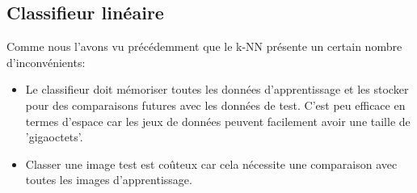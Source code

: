\subsection{Classifieur linéaire}
 
 Comme nous l’avons vu précédemment que le k-NN présente un certain nombre d'inconvénients:
 \begin{itemize}
     \item Le classifieur doit mémoriser toutes les données d'apprentissage et les stocker pour des comparaisons futures avec les données de test. C'est peu efficace en termes d'espace car les jeux de données peuvent facilement avoir une taille de 'gigaoctets'.
    \item Classer une image test est coûteux car cela nécessite une comparaison avec toutes les images d'apprentissage.
\end{itemize}

